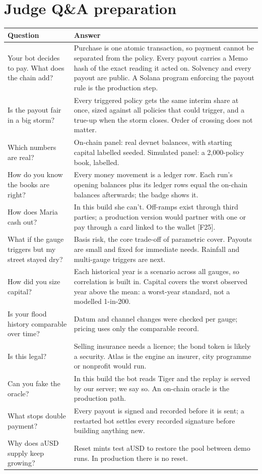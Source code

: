 \documentclass[11pt]{article}
\begin{document}
\section{Judge Q\&A preparation}
{\small
\begin{xltabular}{\linewidth}{@{}L{4.2cm} Y@{}}
\toprule
Question & Answer \\
\midrule
\endhead
Your bot decides to pay. What does the chain add? & Purchase is one atomic transaction, so payment cannot be separated from the policy. Every payout carries a Memo hash of the exact reading it acted on. Solvency and every payout are public. A Solana program enforcing the payout rule is the production step. \\
Is the payout fair in a big storm? & Every triggered policy gets the same interim share at once, sized against all policies that could trigger, and a true-up when the storm closes. Order of crossing does not matter. \\
Which numbers are real? & On-chain panel: real devnet balances, with starting capital labelled seeded. Simulated panel: a 2,000-policy book, labelled. \\
How do you know the books are right? & Every money movement is a ledger row. Each run's opening balances plus its ledger rows equal the on-chain balances afterwards; the badge shows it. \\
How does Maria cash out? & In this build she can't. Off-ramps exist through third parties; a production version would partner with one or pay through a card linked to the wallet [F25]. \\
What if the gauge triggers but my street stayed dry? & Basis risk, the core trade-off of parametric cover. Payouts are small and fixed for immediate needs. Rainfall and multi-gauge triggers are next. \\
How did you size capital? & Each historical year is a scenario across all gauges, so correlation is built in. Capital covers the worst observed year above the mean: a worst-year standard, not a modelled 1-in-200. \\
Is your flood history comparable over time? & Datum and channel changes were checked per gauge; pricing uses only the comparable record. \\
Is this legal? & Selling insurance needs a licence; the bond token is likely a security. Atlas is the engine an insurer, city programme or nonprofit would run. \\
Can you fake the oracle? & In this build the bot reads Tiger and the replay is served by our server; we say so. An on-chain oracle is the production path. \\
What stops double payment? & Every payout is signed and recorded before it is sent; a restarted bot settles every recorded signature before building anything new. \\
Why does aUSD supply keep growing? & Reset mints test aUSD to restore the pool between demo runs. In production there is no reset. \\
\bottomrule
\end{xltabular}
}
\end{document}
